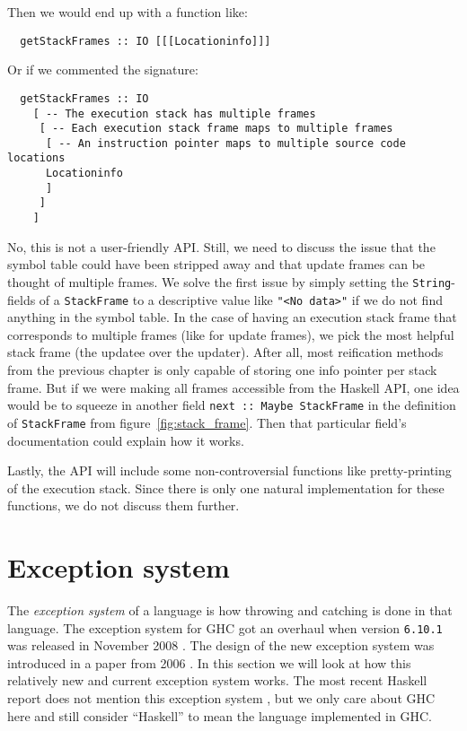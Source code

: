 Then we would end up with a function like:

\begin{verbatim}
  getStackFrames :: IO [[[Locationinfo]]]
\end{verbatim}

Or if we commented the signature:

\begin{verbatim}
  getStackFrames :: IO
    [ -- The execution stack has multiple frames
     [ -- Each execution stack frame maps to multiple frames
      [ -- An instruction pointer maps to multiple source code locations
      Locationinfo
      ]
     ]
    ]
\end{verbatim}

No, this is not a user-friendly API. Still, we need to discuss the issue
that the symbol table could have been stripped away and that update
frames can be thought of multiple frames. We solve the first issue by
simply setting the \texttt{String}-fields of a \texttt{StackFrame} to
a descriptive value like \texttt{"<No data>"} if we do not find anything
in the symbol table. In the case of having an
execution stack frame that corresponds to multiple
frames (like for update frames), we pick the most helpful stack frame
(the updatee over the updater).
After all, most reification methods from the previous chapter is only
capable of storing one info pointer per stack frame. But if we were
making all frames accessible from the Haskell API, one idea would be
to squeeze in another field \texttt{next :: Maybe StackFrame} in the
definition of \texttt{StackFrame} from figure~\ref{fig:stack_frame}.
Then that particular field's documentation could explain how it works.

Lastly, the API will include some non-controversial functions like
pretty-printing of the execution stack.  Since there is only one natural
implementation for these functions, we do not discuss them further.

\section{Exception system} \label{sec:exception_system}

The \emph{exception system} of a language is how throwing and catching
is done in that language. The exception system for GHC got an
overhaul when version \texttt{6.10.1} was released in November 2008
\cite{haskell_org_release_6.10.1}. The design of the new exception
system was introduced in a paper from 2006 \cite{marlow2006extensible}.
In this section we will look at how this relatively new and current
exception system works. The most recent Haskell report does not mention
this exception system \cite[ch. 42]{haskell_report2010}, but we only
care about GHC here and still consider ``Haskell'' to mean the language
implemented in GHC.

